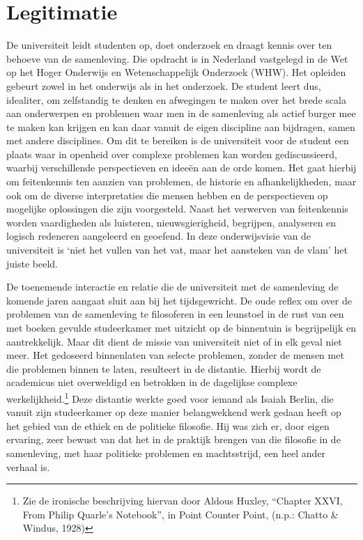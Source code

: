 \documentclass[empirical, authordate, ]{new-jote-article}
\begin{document}
	\section{Legitimatie }



	De universiteit leidt studenten op, doet onderzoek en draagt kennis over ten behoeve van de samenleving. Die opdracht is in Nederland vastgelegd in de Wet op het Hoger Onderwijs en Wetenschappelijk Onderzoek (WHW). Het opleiden gebeurt zowel in het onderwijs als in het onderzoek. De student leert dus, idealiter, om zelfstandig te denken en afwegingen te maken over het brede scala aan onderwerpen en problemen waar men in de samenleving als actief burger mee te maken kan krijgen en kan daar vanuit de eigen discipline aan bijdragen, samen met andere disciplines. Om dit te bereiken is de universiteit voor de student een plaats waar in openheid over complexe problemen kan worden gediscussieerd, waarbij verschillende perspectieven en ideeën aan de orde komen. Het gaat hierbij om feitenkennis ten aanzien van problemen, de historie en afhankelijkheden, maar ook om de diverse interpretaties die mensen hebben en de perspectieven op mogelijke oplossingen die zijn voorgesteld. Naast het verwerven van feitenkennis worden vaardigheden als luisteren, nieuwsgierigheid, begrijpen, analyseren en logisch redeneren aangeleerd en geoefend. In deze onderwijsvisie van de universiteit is ‘niet het vullen van het vat, maar het aansteken van de vlam' het juiste beeld.



	De toenemende interactie en relatie die de universiteit met de samenleving de komende jaren aangaat sluit aan bij het tijdsgewricht. De oude reflex om over de problemen van de samenleving te filosoferen in een leunstoel in de rust van een met boeken gevulde studeerkamer met uitzicht op de binnentuin is begrijpelijk en aantrekkelijk. Maar dit dient de missie van universiteit niet of in elk geval niet meer. Het gedoseerd binnenlaten van selecte problemen, zonder de mensen met die problemen binnen te laten, resulteert in de distantie. Hierbij wordt de academicus niet overweldigd en betrokken in de dagelijkse complexe werkelijkheid.\footnote{Zie de ironische beschrijving hiervan door Aldous Huxley, “Chapter XXVI, From Philip Quarle's Notebook”, in Point Counter Point, (n.p.: Chatto \& Windus, 1928)} Deze distantie werkte goed voor iemand als Isaiah Berlin, die vanuit zijn studeerkamer op deze manier belangwekkend werk gedaan heeft op het gebied van de ethiek en de politieke filosofie. Hij was zich er, door eigen ervaring, zeer bewust van dat het in de praktijk brengen van die filosofie in de samenleving, met haar politieke problemen en machtsstrijd, een heel ander verhaal is.
\end{document}
